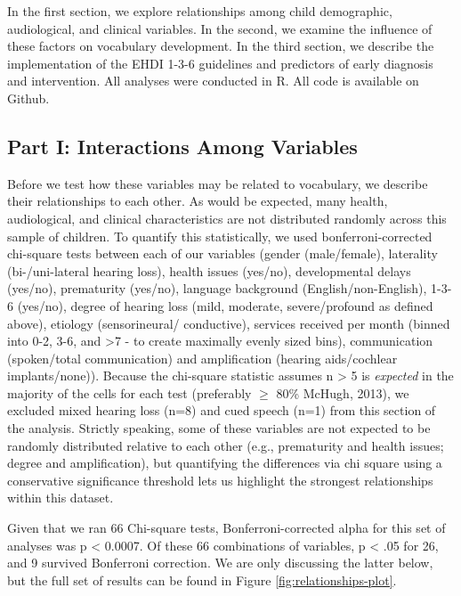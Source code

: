\documentclass[english,man]{apa6}
\begin{document}
In the first section, we explore relationships among child demographic, audiological, and clinical variables. In the second, we examine the influence of these factors on vocabulary development. In the third section, we describe the implementation of the EHDI 1-3-6 guidelines and predictors of early diagnosis and intervention. All analyses were conducted in R. All code is available on Github.

\hypertarget{part-i-interactions-among-variables}{%
\subsection{Part I: Interactions Among Variables}\label{part-i-interactions-among-variables}}

Before we test how these variables may be related to vocabulary, we describe their relationships to each other. As would be expected, many health, audiological, and clinical characteristics are not distributed randomly across this sample of children. To quantify this statistically, we used bonferroni-corrected chi-square tests between each of our variables (gender (male/female), laterality (bi-/uni-lateral hearing loss), health issues (yes/no), developmental delays (yes/no), prematurity (yes/no), language background (English/non-English), 1-3-6 (yes/no), degree of hearing loss (mild, moderate, severe/profound as defined above), etiology (sensorineural/ conductive), services received per month (binned into 0-2, 3-6, and \textgreater{}7 - to create maximally evenly sized bins), communication (spoken/total communication) and amplification (hearing aids/cochlear implants/none)). Because the chi-square statistic assumes n \textgreater{} 5 is \emph{expected} in the majority of the cells for each test (preferably \(\geq\) 80\% McHugh, 2013), we excluded mixed hearing loss (n=8) and cued speech (n=1) from this section of the analysis. Strictly speaking, some of these variables are not expected to be randomly distributed relative to each other (e.g., prematurity and health issues; degree and amplification), but quantifying the differences via chi square using a conservative significance threshold lets us highlight the strongest relationships within this dataset.

Given that we ran 66 Chi-square tests, Bonferroni-corrected alpha for this set of analyses was p \textless{} 0.0007. Of these 66 combinations of variables, p \textless{} .05 for 26, and 9 survived Bonferroni correction. We are only discussing the latter below, but the full set of results can be found in Figure \ref{fig:relationships-plot}.
\end{document}
